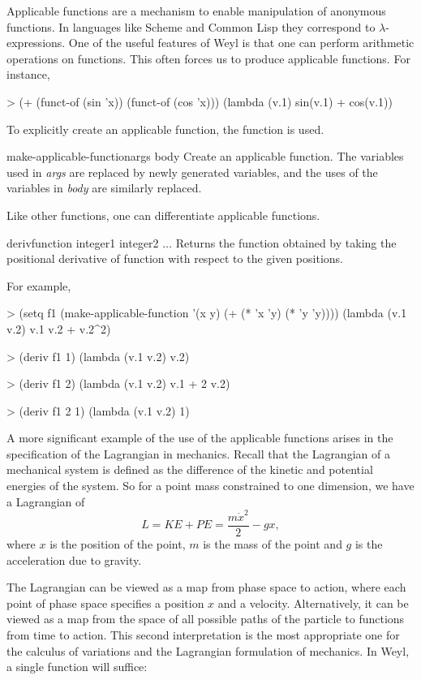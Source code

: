 Applicable functions are a mechanism to enable manipulation of
anonymous functions. In languages like Scheme and Common Lisp they
correspond to $\lambda$-expressions. One of the useful features of
Weyl is that one can perform arithmetic operations on functions. This
often forces us to produce applicable functions. For instance,
\begin{code}
> (+ (funct-of (sin 'x)) (funct-of (cos 'x)))
(lambda (v.1) sin(v.1) + cos(v.1))
\end{code}
  
To explicitly create an applicable function, the function
 is used.
  
\begin{functiondef}{make-applicable-function}{args body}
Create an applicable function. The variables used
in {\em args} are replaced by newly generated variables, and
the uses of the variables in {\em body} are similarly replaced.
\end{functiondef}

Like other functions, one can differentiate applicable functions.
  
\begin{functiondef}{deriv}{function integer1 integer2 $\ldots$}
Returns the function obtained by taking the positional
derivative of function with respect to the given positions.
\end{functiondef}
  
For example,
\begin{code}  
> (setq f1 (make-applicable-function '(x y) (+ (* 'x 'y) (* 'y 'y))))
(lambda (v.1 v.2) v.1 v.2 + v.2^2)
  
> (deriv f1 1)
(lambda (v.1 v.2) v.2)
  
> (deriv f1 2)
(lambda (v.1 v.2) v.1 + 2 v.2)
  
> (deriv f1 2 1)
(lambda (v.1 v.2) 1)
\end{code}
  
A more significant example of the use of the applicable functions
arises in the specification of the Lagrangian in mechanics. Recall
that the Lagrangian of a mechanical system is defined as the
difference of the kinetic and potential energies of the system. So for
a point mass constrained to one dimension, we have a Lagrangian of
\[
L = KE + PE = \frac{m \dot{x}^2}{2} - gx,
\]
where $x$ is the position of the point, $m$ is the mass
of the point and $g$ is the acceleration due to gravity.

The Lagrangian can be viewed as a map from phase space to action, where
each point of phase space specifies a position $x$ and a
velocity. Alternatively, it can be viewed as a map from the space of
all possible paths of the particle to functions from time to
action. This second interpretation is the most appropriate one for the
calculus of variations and the Lagrangian formulation of mechanics. In
Weyl, a single function will suffice:
  
